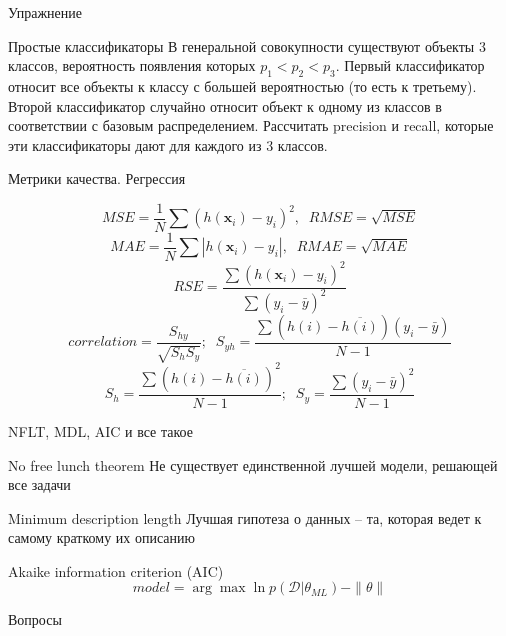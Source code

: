 \documentclass[aspectratio=169]{beamer}
\begin{document}
\begin{frame}{Упражнение}

\begin{exampleblock}{Простые классификаторы}
В генеральной совокупности существуют объекты 3 классов, вероятность появления которых $p_1 < p_2 < p_3$. Первый классификатор относит все объекты к классу с большей вероятностью (то есть к третьему). Второй классификатор случайно относит объект к одному из классов в соответствии с базовым распределением. Рассчитать precision и recall, которые эти классификаторы дают для каждого из 3 классов.
\end{exampleblock}

\end{frame}

\begin{frame}{Метрики качества. Регрессия}

\[
MSE = \frac 1 N \sum (h(\mathbf{x}_i) - y_i)^2, \;\; RMSE = \sqrt{MSE}
\]
\[
MAE =  \frac 1 N \sum |h(\mathbf{x}_i) - y_i|, \;\; RMAE = \sqrt{MAE}
\]
\[
RSE =  \frac{\sum (h(\mathbf{x}_i) - y_i)^2}{\sum (y_i - \bar{y})^2}
\]
\[
correlation = \frac{S_{hy}}{\sqrt{S_h S_y}};\;\; S_{yh} = \frac{\sum(h(i)-\overline{h(i)})(y_i - \bar y)}{N-1}
\]
\[
S_{h} = \frac{\sum(h(i)-\overline{h(i)})^2}{N-1};\;\;S_{y} = \frac{\sum(y_i - \bar y)^2}{N-1}
\]

\end{frame}

\begin{frame}{NFLT, MDL, AIC и все такое}

\begin{block}{No free lunch theorem}
Не существует единственной лучшей модели, решающей все задачи
\end{block}

\begin{block}{Minimum description length}
Лучшая гипотеза о данных -- та, которая ведет к самому краткому их описанию
\end{block}
\begin{block}{Akaike information criterion (AIC)}
\[
model = \arg\max	\ln p(\mathcal{D} | \theta_{ML}) - \|\theta\|
\]
\end{block}

\end{frame}

\begin{frame}[plain]
\begin{center}
{\Large Вопросы}
\end{center}
\end{frame}
\end{document}
